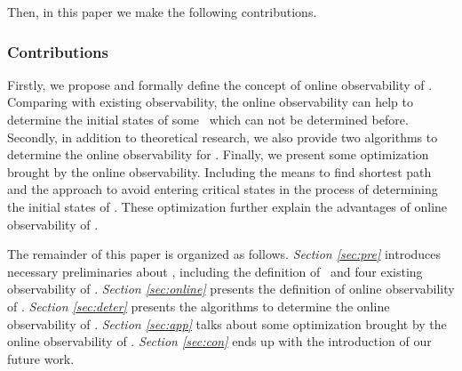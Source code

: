 Then, in this paper we make the following contributions. 


\subsubsection*{Contributions}
Firstly, we propose and formally define the concept of online observability of \BCNs. Comparing with existing observability, the online observability can help to determine the initial states of some \BCNs\ which can not be determined before. Secondly, in addition to theoretical research, we also provide two algorithms to determine the online observability for \BCNs. Finally, we present some optimization brought by the online observability. Including the means to find shortest path and the approach to avoid entering critical states in the process of determining the initial states of \BCNs.  These optimization further explain the advantages of online observability of \BCNs. %

The remainder of this paper is organized as follows.
 {\em Section \ref{sec:pre}} introduces necessary preliminaries about \BCNs, including the definition of \BCNs\ and four existing observability of \BCNs. {\em Section \ref{sec:online}} presents the definition of online observability of \BCNs. {\em Section \ref{sec:deter}} presents the algorithms to determine the online observability of \BCNs. {\em Section \ref{sec:app}} talks about some optimization brought by the online observability of \BCNs. {\em Section \ref{sec:con}} ends up with the introduction of our future work.



